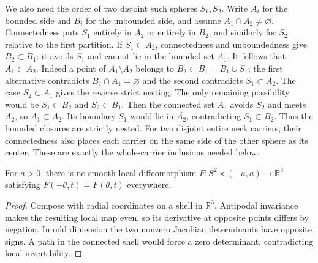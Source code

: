 We also need the order of two disjoint such spheres $S_1,S_2$.
Write $A_i$ for the bounded side and $B_i$ for the unbounded side,
and assume $A_1\cap A_2\ne\varnothing$.
Connectedness puts $S_1$ entirely in $A_2$ or entirely in $B_2$,
and similarly for $S_2$ relative to the first partition.
If $S_1\subset A_2$, connectedness and unboundedness give
$B_2\subset B_1$: it avoids $S_1$ and cannot lie in the bounded
set $A_1$.  It follows that $\overline{A_1}\subset A_2$.
Indeed a point of $\overline{A_1}\setminus A_2$ belongs to
$\overline{B_2}\subset\overline{B_1}=B_1\cup S_1$;
the first alternative contradicts $B_1\cap\overline{A_1}=\varnothing$
and the second contradicts $S_1\subset A_2$.
The case $S_2\subset A_1$ gives the reverse strict nesting.
The only remaining possibility would be
$S_1\subset B_2$ and $S_2\subset B_1$.
Then the connected set $A_1$ avoids $S_2$ and meets $A_2$, so
$A_1\subset A_2$.  Its boundary $S_1$ would lie in
$\overline{A_2}$, contradicting $S_1\subset B_2$.
Thus the bounded closures are strictly nested.
For two disjoint entire neck carriers, their connectedness also
places each carrier on the same side of the other sphere as its
center.  These are exactly the whole-carrier inclusions needed below.

\begin{lemma}
\label{lem:ancient-antipodal-collar}
For $a>0$, there is no smooth local diffeomorphism
$F:S^2\times(-a,a)\to\mathbb R^3$ satisfying
$F(-\theta,t)=F(\theta,t)$ everywhere.
\end{lemma}
\begin{proof}
Compose with radial coordinates on a shell in $\mathbb R^3$. Antipodal
invariance makes the resulting local map even, so its derivative at opposite
points differs by negation. In odd dimension the two nonzero Jacobian
determinants have opposite signs. A path in the connected shell would force a
zero determinant, contradicting local invertibility.
\end{proof}


